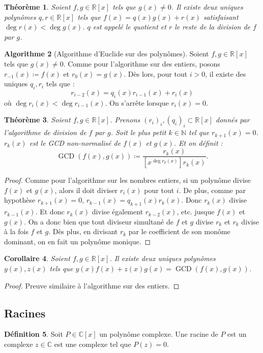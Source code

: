 \documentclass{article}
\DeclareMathOperator{\GCD}{GCD}
\newcommand{\N}{\mathbb N}
\newcommand{\R}{\mathbb R}
\newcommand{\C}{\mathbb C}
\newtheorem{thm}{Théorème}[section]
\newtheorem{cor}[thm]{Corollaire}
\theoremstyle{definition}
\newtheorem{alg}[thm]{Algorithme}
\newtheorem{déf}[thm]{Définition}
\theoremstyle{remark}
\begin{document}
		\begin{thm} Soient $f, g \in \R[x]$ tels que $g(x) \neq 0$. Il existe deux uniques polynômes $q, r \in \R[x]$ tels que $f(x) = q(x)g(x) + r(x)$ satisfaisant
		$\deg r(x) < \deg g(x)$. $q$ est appelé le quotient et $r$ le reste de la division de $f$ par $g$. \end{thm}

		\begin{alg}[Algorithme d'Euclide sur des polynômes] Soient $f, g \in \R[x]$ tels que $g(x) \neq 0$. Comme pour l'algorithme sur des entiers, posons
		$r_{-1}(x) \coloneqq f(x)$ et $r_0(x) = g(x)$. Dès lors, pour tout $i > 0$, il existe des uniques $q_i, r_i$ tels que :\[r_{i-2}(x) = q_i(x)r_{i-1}(x) + r_i(x)\] où
		$\deg r_i(x) < \deg r_{i-1}(x)$. On s'arrête lorsque $r_i(x) = 0$. \end{alg}
	
		\begin{thm} Soient $f, g \in \R[x]$. Prenons $(r_i)_i, (q_i)_i \subset \R[x]$ donnés par l'algorithme de division de $f$ par $g$. Soit le plus petit $k \in \N$ tel
		que $r_{k+1}(x) = 0$. $r_k(x)$ est le GCD non-normalisé de $f(x)$ et $g(x)$. Et on définit : \[\GCD(f(x), g(x)) \coloneqq \frac {r_k(x)}{[x^{\deg r_k(x)}]r_k(x)}.\]
		\end{thm}

		\begin{proof} Comme pour l'algorithme sur les nombres entiers, si un polynôme divise $f(x)$ et $g(x)$, alors il doit diviser $r_i(x)$ pour tout $i$. De plus,
		comme par hypothèse $r_{k+1}(x) = 0$, $r_{k-1}(x) = q_{k+1}(x)r_k(x)$. Donc $r_k(x)$ divise $r_{k-1}(x)$. Et donc $r_k(x)$ divise également $r_{k-2}(x)$, etc. jusque
		$f(x)$ et $g(x)$. On a donc bien que tout diviseur simultané de $f$ et $g$ divise $r_k$ et $r_k$ divise à la fois $f$ et $g$. Dès plus, en divisant $r_k$ par le
		coefficient de son monôme dominant, on en fait un polynôme monique. \end{proof}

		\begin{cor} Soient $f, g \in \R[x]$. Il existe deux uniques polynômes $y(x), z(x)$ tels que $y(x)f(x)+z(x)g(x) = \GCD(f(x), g(x))$. \end{cor}

		\begin{proof} Preuve similaire à l'algorithme sur des entiers. \end{proof}

	\subsection{Racines}
		\begin{déf} Soit $P \in \C[x]$ un polynôme complexe. Une racine de $P$ est un complexe $z \in \C$ est une complexe tel que $P(z) = 0$. \end{déf}
\end{document}
